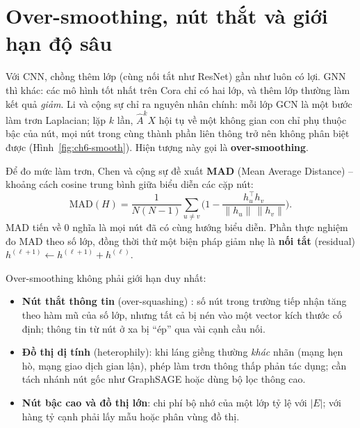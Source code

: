 
\section{Over-smoothing, nút thắt và giới hạn độ sâu}
\label{sec:gnn-depth}

Với CNN, chồng thêm lớp (cùng nối tắt như ResNet) gần như luôn có lợi. GNN thì khác: các mô hình tốt nhất trên Cora chỉ
có hai lớp, và thêm lớp thường làm kết quả \emph{giảm}. Li và cộng sự \cite{ch6:li2018} chỉ ra nguyên nhân chính: mỗi
lớp GCN là một bước làm trơn Laplacian; lặp $k$ lần, $\hat A^k X$ hội tụ về một không gian con chỉ phụ thuộc bậc của
nút, mọi nút trong cùng thành phần liên thông trở nên không phân biệt được (Hình~\ref{fig:ch6-smooth}). Hiện tượng này
gọi là \textbf{over-smoothing}.


Để đo mức làm trơn, Chen và cộng sự \cite{ch6:chen2020mad} đề xuất \textbf{MAD} (Mean Average Distance) -- khoảng cách
cosine trung bình giữa biểu diễn các cặp nút:
\begin{equation}
  \mathrm{MAD}(H)=\frac{1}{N(N-1)}\sum_{u\neq v}\Big(1-\frac{h_u^{\top}h_v}{\lVert h_u\rVert\,\lVert h_v\rVert}\Big).
\end{equation}
MAD tiến về 0 nghĩa là mọi nút đã có cùng hướng biểu diễn. Phần thực nghiệm đo MAD theo số lớp, đồng thời thử một
biện pháp giảm nhẹ là \textbf{nối tắt} (residual) $h^{(\ell+1)}\leftarrow h^{(\ell+1)}+h^{(\ell)}$.

Over-smoothing không phải giới hạn duy nhất:
\begin{itemize}
  \item \textbf{Nút thắt thông tin} (over-squashing) \cite{ch6:alon2021}: số nút trong trường tiếp nhận tăng theo hàm
        mũ của số lớp, nhưng tất cả bị nén vào một vector kích thước cố định; thông tin từ nút ở xa bị ``ép'' qua vài
        cạnh cầu nối.
  \item \textbf{Đồ thị dị tính} (heterophily): khi láng giềng thường \emph{khác} nhãn (mạng hẹn hò, mạng giao dịch gian
        lận), phép làm trơn thông thấp phản tác dụng; cần tách nhánh nút gốc như GraphSAGE hoặc dùng bộ lọc thông cao.
  \item \textbf{Nút bậc cao và đồ thị lớn}: chi phí bộ nhớ của một lớp tỷ lệ với $|E|$; với hàng tỷ cạnh phải lấy mẫu
        hoặc phân vùng đồ thị.
\end{itemize}


